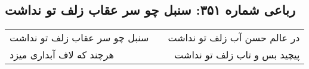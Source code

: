 \begin{center}
\section*{رباعی شماره ۳۵۱: سنبل چو سر عقاب زلف تو نداشت}
\label{sec:0351}
\begin{longtable}{l p{0.5cm} r}
سنبل چو سر عقاب زلف تو نداشت
&&
در عالم حسن آب زلف تو نداشت
\\
هرچند که لاف آبداری میزد
&&
پیچید بس و تاب زلف تو نداشت
\\
\end{longtable}
\end{center}

